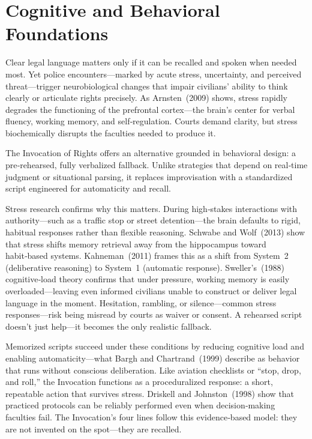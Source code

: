 \section{Cognitive and Behavioral Foundations}

Clear legal language matters only if it can be recalled and spoken when needed most. Yet police encounters—marked by acute stress, uncertainty, and perceived threat—trigger neurobiological changes that impair civilians’ ability to think clearly or articulate rights precisely. As Arnsten (2009) shows, stress rapidly degrades the functioning of the prefrontal cortex—the brain’s center for verbal fluency, working memory, and self‑regulation. Courts demand clarity, but stress biochemically disrupts the faculties needed to produce it.

The Invocation of Rights offers an alternative grounded in behavioral design: a pre‑rehearsed, fully verbalized fallback. Unlike strategies that depend on real‑time judgment or situational parsing, it replaces improvisation with a standardized script engineered for automaticity and recall.

Stress research confirms why this matters. During high‑stakes interactions with authority—such as a traffic stop or street detention—the brain defaults to rigid, habitual responses rather than flexible reasoning. Schwabe and Wolf (2013) show that stress shifts memory retrieval away from the hippocampus toward habit‑based systems. Kahneman (2011) frames this as a shift from System 2 (deliberative reasoning) to System 1 (automatic response). Sweller’s (1988) cognitive‑load theory confirms that under pressure, working memory is easily overloaded—leaving even informed civilians unable to construct or deliver legal language in the moment. Hesitation, rambling, or silence—common stress responses—risk being misread by courts as waiver or consent. A rehearsed script doesn’t just help—it becomes the only realistic fallback.

Memorized scripts succeed under these conditions by reducing cognitive load and enabling automaticity—what Bargh and Chartrand (1999) describe as behavior that runs without conscious deliberation. Like aviation checklists or ``stop, drop, and roll,'' the Invocation functions as a proceduralized response: a short, repeatable action that survives stress. Driskell and Johnston (1998) show that practiced protocols can be reliably performed even when decision‑making faculties fail. The Invocation’s four lines follow this evidence‑based model: they are not invented on the spot—they are recalled.

